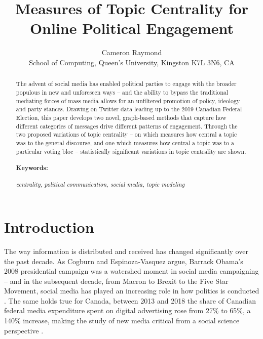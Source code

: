 \documentclass{nws}
\title[Measures of Topic Centrality for Online Political Engagement]
      {Measures of Topic Centrality for Online Political Engagement}
\author[C.J.K Raymond]
        {Cameron Raymond\\
        School of Computing, Queen's University, Kingston K7L 3N6, CA\\
         \email{c.raymond@queensu.ca}}
\begin{document}
\label{firstpage}

\maketitle

\begin{abstract}
  The advent of social media has enabled political parties to engage with the
  broader populous in new and unforeseen ways -- and the ability to bypass the
  traditional mediating forces of mass media allows for an unfiltered promotion
  of policy, ideology and party stances. Drawing on Twitter data leading up to
  the 2019 Canadian Federal Election, this paper develops two novel, graph-based methods that
  capture how different categories of messages drive different patterns of
  engagement. Through the two proposed variations of topic centrality -- on which
  measures how central a topic was to the general discourse, and one which
  measures how central a topic was to a particular voting bloc -- statistically
  significant variations in topic centrality are shown.
  \paragraph{Keywords:} \emph{centrality, political communication, social media, topic modeling}
\end{abstract}

\tableofcontents

\section{Introduction}

The way information is distributed and received has changed significantly over
the past decade. As Cogburn and Espinoza-Vasquez argue, Barrack Obama’s 2008
presidential campaign was a watershed moment in social media campaigning – and
in the subsequent decade, from Macron to Brexit to the Five Star Movement,
social media has played an increasing role in how politics is conducted
\cite{cogburn2011networked}.  The same holds true for Canada, between 2013 and
2018 the share of Canadian federal media expenditure spent on digital
advertising rose from 27\% to 65\%, a 140\% increase, making the study of new
media critical from a social science perspective
\cite{annualReportCanadaAdvertisingActivities_2018}. 
\end{document}
